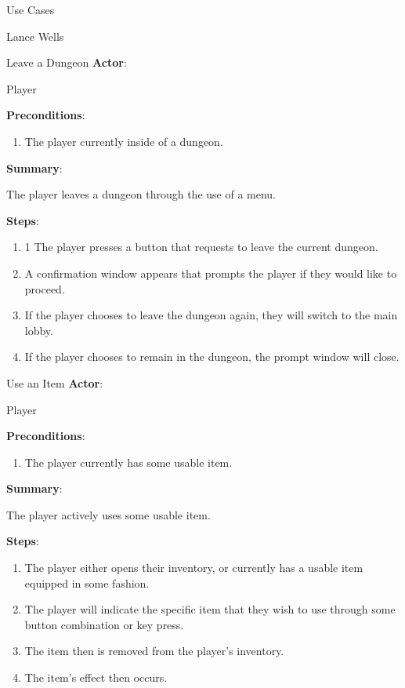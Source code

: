 \documentclass[12pt]{report}
\begin{document}
\begin{section}{Use Cases}
\begin{subsection}{Lance Wells}
\begin{subsubsection}{Leave a Dungeon}
\textbf{Actor}:

Player

\textbf{Preconditions}:

\begin{enumerate}
\item The player currently inside of a dungeon.
\end{enumerate}

\textbf{Summary}:

The player leaves a dungeon through the use of a menu.

\textbf{Steps}:

\begin{enumerate}
\item1 The player presses a button that requests to leave the current
dungeon.
\item A confirmation window appears that prompts the player if they would
like to proceed.
\item If the player chooses to leave the dungeon again, they will switch
to the main lobby.
\item If the player chooses to remain in the dungeon, the prompt window will
close.
\end{enumerate}
\end{subsubsection}

\begin{subsubsection}{Use an Item}
\textbf{Actor}:

Player

\textbf{Preconditions}:

\begin{enumerate}
\item The player currently has some usable item.
\end{enumerate}

\textbf{Summary}:

The player actively uses some usable item.

\textbf{Steps}:

\begin{enumerate}
\item The player either opens their inventory, or currently has a usable
item equipped in some fashion.
\item The player will indicate the specific item that they wish to use
through some button combination or key press.
\item The item then is removed from the player's inventory.
\item The item's effect then occurs.
\end{enumerate}
\end{subsubsection}


\end{subsection}
\end{section}
\end{document}

